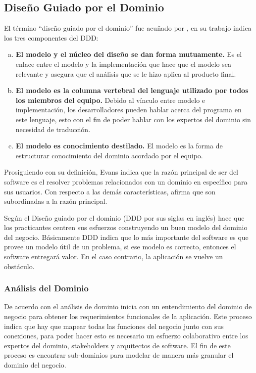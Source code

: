 \subsection{Diseño Guiado por el Dominio}

El término ``diseño guiado por el dominio'' fue acuñado por \cite{evans2004domain}, en su trabajo
indica los tres componentes del DDD:

\vspace{-1em}
\begin{enumerate}[a.]
  \item \textbf{El modelo y el núcleo del diseño se dan forma mutuamente.}
    Es el enlace entre el modelo y la implementación que hace que el modelo sea relevante y asegura que el
    análisis que se le hizo aplica al producto final.
  \item \textbf{El modelo es la columna vertebral del lenguaje utilizado por todos los miembros del equipo.}
    Debido al vínculo entre modelo e implementación, los desarrolladores pueden hablar acerca del
    programa en este lenguaje, esto con el fin de poder hablar con los expertos del dominio sin
    necesidad de traducción.
  \item \textbf{El modelo es conocimiento destilado.}
    El modelo es la forma de estructurar conocimiento del dominio acordado por el equipo.
\end{enumerate}
\vspace{-1em}

Prosiguiendo con su definición, Evans indica que la razón principal de ser del software es el
resolver problemas relacionados con un dominio en específico para sus usuarios.
Con respecto a las demás características, afirma que son subordinadas a la razón principal.

Según \cite{percival2020architecture} el Diseño guiado por el dominio (DDD por sus siglas en inglés)
hace que los practicantes centren sus esfuerzos construyendo un buen modelo del dominio del negocio.
Básicamente DDD indica que lo más importante del software es que provee un modelo útil de un problema,
si ese modelo es correcto, entonces el software entregará valor.
En el caso contrario, la aplicación se vuelve un obstáculo.


\subsubsection{Análisis del Dominio}

De acuerdo con \cite{bjorner2019domain} el análisis de dominio inicia con un entendimiento
del dominio de negocio para obtener los requerimientos funcionales de la aplicación.
Este proceso indica que hay que mapear todas las funciones del negocio junto con sus conexiones,
para poder hacer esto es necesario un esfuerzo colaborativo entre los expertos del dominio, stakeholders
y arquitectos de software.
El fin de este proceso es encontrar sub-dominios para modelar de manera más granular el dominio del negocio.

